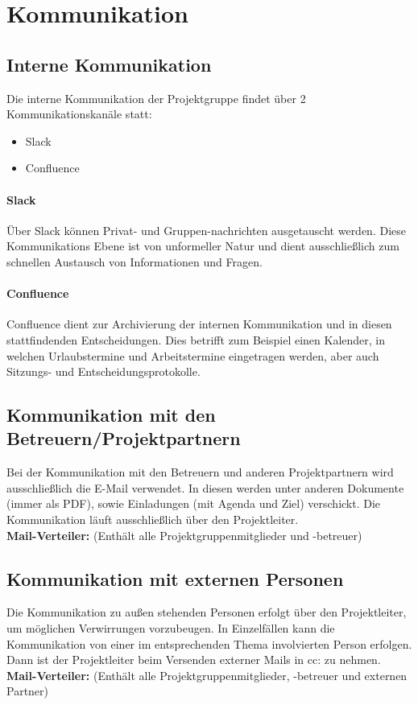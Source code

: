 \section{Kommunikation}
\subsection{Interne Kommunikation}
Die interne Kommunikation der Projektgruppe findet über 2 Kommunikationskanäle statt:
\begin{itemize}
	\item Slack
	\item Confluence
\end{itemize}

\paragraph{Slack} Über Slack können Privat- und Gruppen-nachrichten ausgetauscht werden. Diese Kommunikations Ebene ist von unformeller Natur und dient ausschließlich zum schnellen Austausch von Informationen und Fragen.

\paragraph{Confluence} Confluence dient zur Archivierung der internen Kommunikation und in diesen stattfindenden Entscheidungen. Dies betrifft zum Beispiel einen Kalender, in welchen Urlaubstermine und Arbeitstermine eingetragen werden, aber auch Sitzungs- und Entscheidungsprotokolle. 

\subsection{Kommunikation mit den Betreuern/Projektpartnern}
Bei der Kommunikation mit den Betreuern und anderen Projektpartnern wird ausschließlich die E-Mail verwendet. In diesen werden unter anderen Dokumente (immer als PDF), sowie Einladungen (mit Agenda und Ziel) verschickt. Die Kommunikation läuft ausschließlich über den Projektleiter. \\
\textbf{Mail-Verteiler:}  (Enthält alle Projektgruppenmitglieder und -betreuer)

\subsection{Kommunikation mit externen Personen}
Die Kommunikation zu außen stehenden Personen erfolgt über den Projektleiter, um möglichen Verwirrungen vorzubeugen. In Einzelfällen kann die Kommunikation von einer im entsprechenden Thema involvierten Person erfolgen. Dann ist der Projektleiter beim Versenden externer Mails in cc: zu nehmen.\\
\textbf{Mail-Verteiler:}  (Enthält alle Projektgruppenmitglieder, -betreuer und externen Partner)
